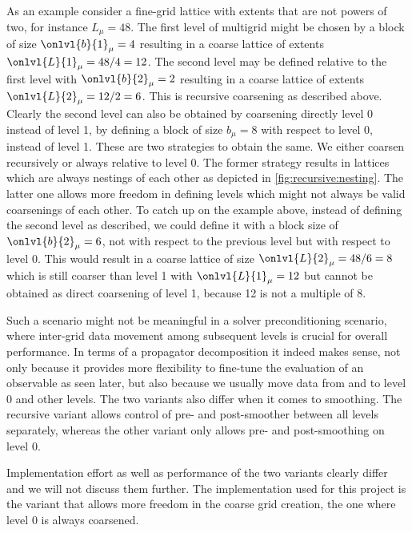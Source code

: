 As an example consider a fine-grid lattice with extents that are not powers of two, for instance $L_{\mu} = 48$.
The first level of multigrid might be chosen by a block of size $\onlvl{b}{1}_{\mu} = 4$ resulting in a coarse lattice of extents $\onlvl{L}{1}_{\mu} = 48 / 4 = 12$.
The second level may be defined relative to the first level with $\onlvl{b}{2}_{\mu} = 2$ resulting in a coarse lattice of extents $\onlvl{L}{2}_{\mu} = 12 / 2 = 6$.
This is recursive coarsening as described above.
Clearly the second level can also be obtained by coarsening directly level \num{0} instead of level \num{1}, by defining a block of size $b_{\mu} = 8$ with respect to level \num{0}, instead of level \num{1}.
These are two strategies to obtain the same.
We either coarsen recursively or always relative to level \num{0}.
The former strategy results in lattices which are always nestings of each other as depicted in \cref{fig:recursive:nesting}.
The latter one allows more freedom in defining levels which might not always be valid coarsenings of each other.
To catch up on the example above, instead of defining the second level as described, we could define it with a block size of $\onlvl{b}{2}_{\mu} = 6$, not with respect to the previous level but with respect to level \num{0}.
This would result in a coarse lattice of size $\onlvl{L}{2}_{\mu} = 48 / 6 = 8$ which is still coarser than level \num{1} with $\onlvl{L}{1}_{\mu} = 12$ but cannot be obtained as direct coarsening of level \num{1}, because \num{12} is not a multiple of \num{8}.

Such a scenario might not be meaningful in a solver preconditioning scenario, where inter-grid data movement among subsequent levels is crucial for overall performance.
In terms of a propagator decomposition it indeed makes sense, not only because it provides more flexibility to fine-tune the evaluation of an observable as seen later, but also because we usually move data from and to level \num{0} and other levels.
The two variants also differ when it comes to smoothing.
The recursive variant allows control of pre- and post-smoother between all levels separately, whereas the other variant only allows pre- and post-smoothing on level \num{0}.

Implementation effort as well as performance of the two variants clearly differ and we will not discuss them further.
The implementation used for this project is the variant that allows more freedom in the coarse grid creation, \ie the one where level \num{0} is always coarsened.

